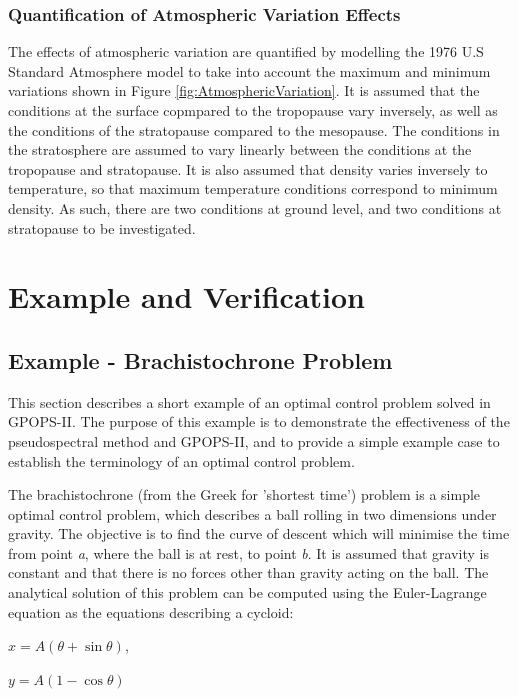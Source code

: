 \subsection{Quantification of Atmospheric Variation Effects}

The effects of atmospheric variation are quantified by modelling the 1976 U.S Standard Atmosphere model to take into account the maximum and minimum variations shown in Figure \ref{fig:AtmosphericVariation}. It is assumed that the conditions at the surface copmpared to the tropopause vary inversely, as well as the conditions of the stratopause compared to the mesopause. The conditions in the stratosphere are assumed to vary linearly between the conditions at the tropopause and stratopause. It is also assumed that density varies inversely to temperature, so that maximum temperature conditions correspond to minimum density. As such, there are two conditions at ground level, and two conditions at stratopause to be investigated. 



\chapter{Example and Verification}

\section{Example - Brachistochrone Problem}

This section describes a short example of an optimal control problem solved in GPOPS-II. The purpose of this example is to demonstrate the effectiveness of the pseudospectral method and GPOPS-II, and to provide a simple example case to establish the terminology of an optimal control problem.  


The brachistochrone (from the Greek for 'shortest time') problem is a simple optimal control problem, which describes a ball rolling in two dimensions under gravity. The objective is to find the curve of descent which will minimise the time from point \textit{a}, where the ball is at rest, to point \textit{b}. It is assumed that gravity is constant and that there is no forces other than gravity acting on the ball. 
The analytical solution of this problem can be computed using the Euler-Lagrange equation as the equations describing a cycloid:

$x = A(\theta + \sin\theta) $,

$y=A(1 - \cos\theta)$

